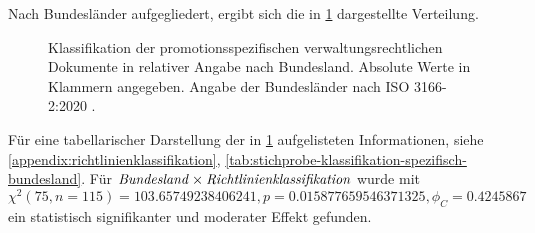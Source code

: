 Nach Bundesländer aufgegliedert, ergibt sich die in \cref{fig:policy-klassifikation-spezifisch-absolut} dargestellte Verteilung.
\begin{figure}[!htbp]
    \centering
    \resizebox{\textwidth}{!}{}
    \caption{Klassifikation der promotionsspezifischen verwaltungsrechtlichen Dokumente in relativer Angabe nach Bundesland. Absolute Werte in Klammern angegeben. Angabe der Bundesländer nach ISO 3166-2:2020 \autocite{ISO3166}.}
    \label{fig:policy-klassifikation-spezifisch-absolut}
\end{figure}
Für eine tabellarischer Darstellung der in \cref{fig:policy-klassifikation-spezifisch-absolut} aufgelisteten Informationen, siehe \cref{appendix:richtlinienklassifikation}, \cref{tab:stichprobe-klassifikation-spezifisch-bundesland}.
Für $\text{\textit{Bundesland}}\times\text{\textit{Richtlinienklassifikation}}$ wurde mit $\chi^2 (\num{75}, n=\num{115}) = \num[round-mode=places,round-precision=2]{103,65749238406241}, p = \num[round-mode=places,round-precision=2]{0,015877659546371325},\phi_C=\num[round-mode=places,round-precision=2]{0.4245867}$ ein statistisch signifikanter und moderater Effekt gefunden.

